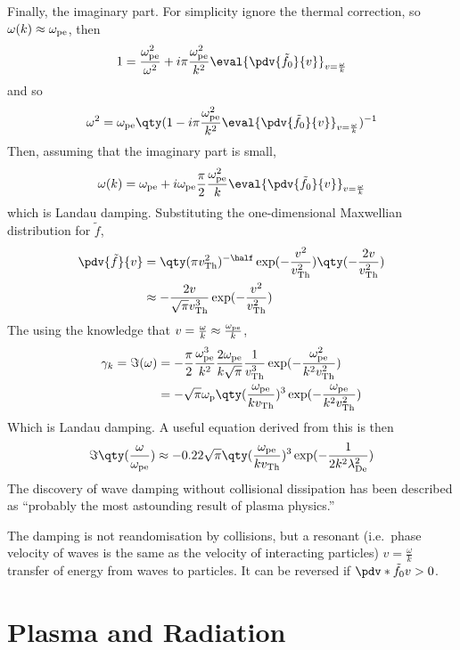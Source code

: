 \documentclass{book}         		                %
\begin{document}
Finally, the imaginary part. For simplicity ignore the thermal
correction, so $\omega(k) \approx \omega_{\rm pe}$, then
\[ 1 = \frac{\omega_{\rm pe}^2}{\omega^2} + i \pi \frac{\omega_{\rm
    pe}^2}{k^2} \eval{\pdv{\tilde{f}_0}{v}}_{v=\frac{\omega}{k}} \]
and so
\[ \omega^2 = \omega_{\rm pe} \qty( 1 - i \pi \frac{\omega_{\rm
    pe}^2}{k^2} \eval{ \pdv{\tilde{f}_0}{v} }_{v=\frac{\omega}{k}}
)^{-1} \]
Then, assuming that the imaginary part is small,
\begin{equation}
  \label{eq:33}
  \omega(k) = \omega_{\rm pe} + i \omega_{\rm pe} \frac{\pi}{2} \frac{\omega_{\rm pe}^2}{k} \eval{\pdv{\tilde{f}_0}{v}}_{v = \frac{\omega}{k}}
\end{equation}
which is Landau damping.  Substituting the one-dimensional Maxwellian
distribution for $\tilde{f}$,
\begin{align*} 
\pdv{\tilde{f}}{v} &= \qty( \pi v_{\rm Th}^2 )^{- \half} \exp( - \frac{v^2}{v_{\rm Th}^2}) \qty( - \frac{2v}{v_{\rm Th}^2}) \\ &\approx - \frac{2v}{\sqrt{\pi} v_{\rm Th}^3} \exp( - \frac{v^2}{v_{\rm Th}^2} ) 
\end{align*}
The using the knowledge that $v= \frac{\omega}{k} \approx
\frac{\omega_{\rm pe}}{k}$,
\begin{align}
  \gamma_k = \Im(\omega) &= - \frac{\pi}{2} \frac{\omega_{\rm pe}^3}{k^2} \frac{2 \omega_{\rm pe}}{k \sqrt{\pi}} \frac{1}{v_{\rm Th}^3} \exp( - \frac{\omega_{\rm pe}^2}{k^2 v_{\rm Th}^2} ) \nonumber\\
&= - \sqrt{\pi} \omega_{\rm p} \qty( \frac{\omega_{\rm pe}}{k v_{\rm Th}})^3 \exp( - \frac{\omega_{\rm pe}}{k^2 v_{\rm Th}^2})
\end{align}
Which is Landau damping. A useful equation derived from this is then
\begin{equation}
  \label{eq:34}
  \Im\qty(\frac{\omega}{\omega_{\rm pe}}) \approx -0.22 \sqrt{\pi} \qty( \frac{\omega_{\rm pe}}{k v_{\rm Th}})^3 \exp(- \frac{1}{2k^2 \lambda^2_{\rm De}} )
\end{equation}
The discovery of wave damping without collisional dissipation has been described as ``probably the most astounding result of plasma physics.''

The damping is not reandomisation by collisions, but a resonant (i.e.\
phase velocity of waves is the same as the velocity of interacting
particles) $v=\frac{\omega}{k}$ transfer of energy from waves to
particles. It can be reversed if $\pdv*{\tilde{f}_0}{v}>0$.
\chapter{Plasma and Radiation}
\label{cha:plasma-radiation}
\end{document}
